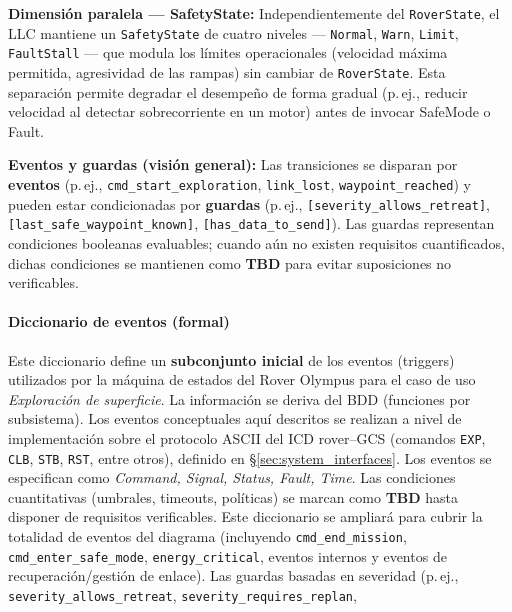 \textbf{Dimensión paralela --- SafetyState:} Independientemente del \texttt{RoverState}, el LLC mantiene un \texttt{SafetyState} de cuatro niveles --- \texttt{Normal}, \texttt{Warn}, \texttt{Limit}, \texttt{FaultStall} --- que modula los límites operacionales (velocidad máxima permitida, agresividad de las rampas) sin cambiar de \texttt{RoverState}. Esta separación permite degradar el desempeño de forma gradual (p.\,ej., reducir velocidad al detectar sobrecorriente en un motor) antes de invocar SafeMode o Fault.


\textbf{Eventos y guardas (visión general):}
Las transiciones se disparan por \textbf{eventos} (p.\,ej.,
\texttt{cmd\_\allowbreak start\_\allowbreak exploration},
\texttt{link\_\allowbreak lost},
\texttt{waypoint\_\allowbreak reached})
y pueden estar condicionadas por \textbf{guardas} (p.\,ej.,
\texttt{[severity\_\allowbreak allows\_\allowbreak retreat]},
\texttt{[last\_\allowbreak safe\_\allowbreak waypoint\_\allowbreak known]},
\texttt{[has\_\allowbreak data\_\allowbreak to\_\allowbreak send]}).
Las guardas representan condiciones booleanas evaluables; cuando aún no existen
requisitos cuantificados, dichas condiciones se mantienen como \textbf{TBD}
para evitar suposiciones no verificables.
\cite{UMLStateMachinesConcepts2,UMLStateMachinesConcepts1}

\paragraph{Diccionario de eventos (formal)}\label{para:uc01_events}
Este diccionario define un \textbf{subconjunto inicial} de los eventos (triggers) utilizados por la máquina de estados del Rover Olympus para el caso de uso \textit{Exploración de superficie}.
La información se deriva del BDD (funciones por subsistema).
Los eventos conceptuales aquí descritos se realizan a nivel de implementación sobre el protocolo ASCII del ICD rover--GCS (comandos \texttt{EXP}, \texttt{CLB}, \texttt{STB}, \texttt{RST}, entre otros), definido en \S\ref{sec:system_interfaces}.
Los eventos se especifican como \textit{Command, Signal, Status, Fault, Time}. 
Las condiciones cuantitativas (umbrales, timeouts, políticas) se marcan como \textbf{TBD} hasta disponer de requisitos verificables.
Este diccionario se ampliará para cubrir la totalidad de eventos del diagrama (incluyendo \texttt{cmd\_end\_mission}, \texttt{cmd\_enter\_safe\_mode}, \texttt{energy\_critical}, eventos internos y eventos de recuperación/gestión de enlace). 
Las guardas basadas en severidad (p.\,ej., \texttt{severity\_allows\_retreat}, \texttt{severity\_requires\_replan},


